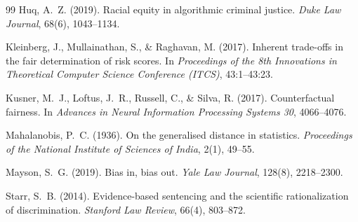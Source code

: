 \documentclass[11pt]{article}
\begin{document}
\begin{thebibliography}{99}
Huq, A.~Z. (2019).
Racial equity in algorithmic criminal justice.
\emph{Duke Law Journal}, 68(6), 1043--1134.

Kleinberg, J., Mullainathan, S., \& Raghavan, M. (2017).
Inherent trade-offs in the fair determination of risk scores.
In \emph{Proceedings of the 8th Innovations in Theoretical Computer
Science Conference (ITCS)}, 43:1--43:23.

Kusner, M.~J., Loftus, J.~R., Russell, C., \& Silva, R. (2017).
Counterfactual fairness.
In \emph{Advances in Neural Information Processing Systems 30},
4066--4076.

Mahalanobis, P.~C. (1936).
On the generalised distance in statistics.
\emph{Proceedings of the National Institute of Sciences of India},
2(1), 49--55.

Mayson, S.~G. (2019).
Bias in, bias out.
\emph{Yale Law Journal}, 128(8), 2218--2300.

Starr, S.~B. (2014).
Evidence-based sentencing and the scientific rationalization of
discrimination.
\emph{Stanford Law Review}, 66(4), 803--872.

\end{thebibliography}
\end{document}
